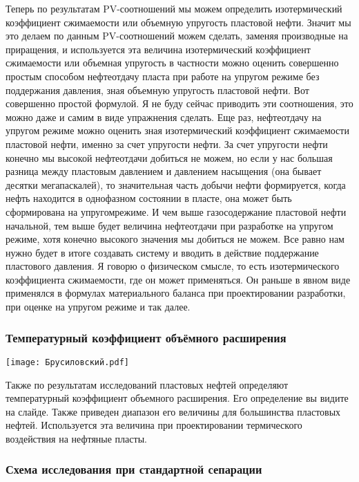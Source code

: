 \documentclass[main.tex]{subfiles}
\begin{document}
Теперь по результатам PV-соотношений мы можем определить изотермический коэффициент сжимаемости или объемную упругость пластовой нефти.
Значит мы это делаем по данным PV-соотношений можем сделать, заменяя производные на приращения, и используется эта величина изотермический коэффициент сжимаемости или объемная упругость в частности можно оценить совершенно простым способом нефтеотдачу пласта при работе на упругом режиме без поддержания давления, зная объемную упругость пластовой нефти.
Вот совершенно простой формулой.
Я не буду сейчас приводить эти соотношения, это можно даже и самим в виде упражнения сделать.
Еще раз, нефтеотдачу на упругом режиме можно оценить зная изотермический коэффициент сжимаемости пластовой нефти, именно за счет упругости нефти.
За счет упругости нефти конечно мы высокой нефтеотдачи добиться не можем, но если у нас большая разница между пластовым давлением и давлением насыщения (она бывает десятки мегапаскалей), то значительная часть добычи нефти формируется, когда нефть находится в однофазном состоянии
в пласте, она может быть сформирована на упругомрежиме.
И чем выше газосодержание пластовой нефти начальной, тем выше будет величина нефтеотдачи при разработке на упругом режиме, хотя конечно высокого значения мы добиться не можем.
Все равно нам нужно будет в итоге создавать систему и вводить в действие поддержание пластового давления.
Я говорю о физическом смысле, то есть изотермического коэффициента сжимаемости, где он может применяться.
Он раньше в явном виде применялся в формулах материального баланса при проектировании разработки, при оценке на упругом режиме и так далее.

\subsubsection{Температурный коэффициент объёмного расширения}

\begin{center}
\texttt{[image: Брусиловский.pdf]}
\end{center}

Также по результатам исследований пластовых нефтей определяют температурный коэффициент объемного расширения.
Его определение вы видите на слайде.
Также приведен диапазон его величины для большинства пластовых нефтей.
Используется эта величина при проектировании термического воздействия на нефтяные пласты.

\subsubsection{Схема исследования при стандартной сепарации}
\end{document}
